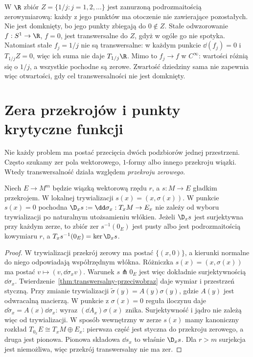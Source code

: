 \begin{przyklad}
\label{prz:transwersalnosc-niedomknieta-19}
W $\R$ zbiór $Z=\{1/j:j=1,2,\ldots\}$ jest
zanurzoną podrozmaitością zerowymiarową:
każdy z jego punktów ma otoczenie nie zawierające pozostałych.
Nie jest domknięty, bo jego punkty zbiegają do $0\notin Z$.
Stałe odwzorowanie $f:S^1\to\R$, $f=0$, jest transwersalne
do $Z$, gdyż w ogóle go nie spotyka.
Natomiast stałe $f_j=1/j$ nie są transwersalne:
w każdym punkcie $\dd(f_j)=0$ i $T_{1/j}Z=0$,
więc ich suma nie daje $T_{1/j}\R$.
Mimo to $f_j\to f$ w $C^\infty$:
wartości różnią się o $1/j$, a wszystkie pochodne są zerowe.
Zwartość dziedziny sama nie zapewnia więc otwartości,
gdy cel transwersalności nie jest domknięty.
\end{przyklad}

\section{Zera przekrojów i punkty krytyczne funkcji}
\label{sec:transwersalnosc-przekroje}

Nie każdy problem ma postać przecięcia dwóch
podzbiorów jednej przestrzeni. Często szukamy
zer pola wektorowego, $1$-formy albo innego
przekroju wiązki. Wtedy transwersalność działa
względem \emph{przekroju zerowego}.

\begin{twierdzenie}
\label{thm:zera-przekroju}
Niech $E\to M^m$ będzie wiązką wektorową
rzędu $r$, a $s:M\to E$ gładkim przekrojem.
W lokalnej trywializacji $s(x)=(x,\sigma(x))$.
W punkcie $s(x)=0$ pochodna
$\D_xs:=\dd\sigma_x:T_xM\to E_x$
nie zależy od wyboru trywializacji
po naturalnym utożsamieniu włókien.
Jeżeli $\D_xs$ jest surjektywna przy
każdym zerze, to zbiór zer $s^{-1}(0_E)$
jest pusty albo jest podrozmaitością kowymiaru $r$, a
$T_xs^{-1}(0_E)=\ker\D_xs$.
\end{twierdzenie}
\begin{proof}
W trywializacji przekrój zerowy ma postać
$\{(x,0)\}$, a kierunki normalne do niego
odpowiadają współrzędnym włókna.
Różniczka $s(x)=(x,\sigma(x))$ ma postać
$v\mapsto(v,\dd\sigma_xv)$. Warunek
$s\pitchfork 0_E$ jest więc dokładnie
surjektywnością $\dd\sigma_x$.
Twierdzenie~\ref{thm:transwersalny-przeciwobraz}
daje wymiar i przestrzeń styczną.
Przy zmianie trywializacji
$\widetilde\sigma(y)=A(y)\sigma(y)$,
gdzie $A(y)$ jest odwracalną macierzą.
W punkcie z $\sigma(x)=0$ reguła iloczynu
daje $\dd\widetilde\sigma_x=A(x)\dd\sigma_x$:
wyraz $(\dd A_x)\sigma(x)$ znika.
Surjektywność i jądro nie zależą więc
od trywializacji. W sposób wewnętrzny w zerze $s(x)$
mamy kanoniczny rozkład
$T_{0_x}E\cong T_xM\oplus E_x$: pierwsza część jest
styczna do przekroju zerowego, a druga jest pionowa.
Pionowa składowa $\dd s_x$ to właśnie $\D_xs$.
Dla $r>m$ surjekcja jest niemożliwa, więc przekrój
transwersalny nie ma zer.
\end{proof}

